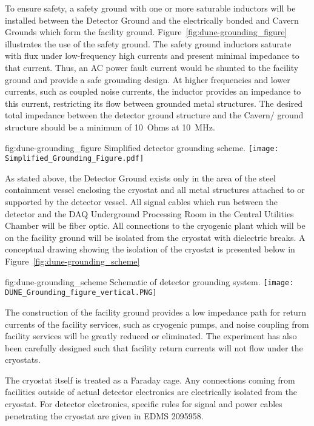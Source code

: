 To ensure safety, a safety ground with one or more saturable inductors
will be installed between the Detector Ground and the electrically
bonded  and Cavern Grounds which form the facility ground.
Figure~\ref{fig:dune-grounding_figure} illustrates the use of the
safety ground. The safety ground inductors saturate with flux under
low-frequency high currents and present minimal impedance to that
current.  Thus, an AC power fault current would be shunted to the
facility ground and provide a safe grounding design. At higher
frequencies and lower currents, such as coupled noise currents, the
inductor provides an impedance to this current, restricting its flow
between grounded metal structures. The desired total impedance between
the detector ground structure and the Cavern/ ground
structure should be a minimum of \SI{10}{Ohms} at \SI{10}{MHz}.

\begin{dunefigure}{fig:dune-grounding_figure}
  {Simplified detector grounding scheme.}
  \texttt{[image: Simplified\_Grounding\_Figure.pdf]}
\end{dunefigure}

As stated above, the Detector Ground exists only in the area of the
steel containment vessel enclosing the cryostat and all metal
structures attached to or supported by the detector vessel.  All
signal cables which run between the detector and the DAQ Underground
Processing Room in the Central Utilities Chamber will be fiber optic.
All connections to the cryogenic plant which will be on the facility
ground will be isolated from the cryostat with dielectric breaks.  A
conceptual drawing showing the isolation of the cryostat is presented
below in Figure~\ref{fig:dune-grounding_scheme}

\begin{dunefigure}{fig:dune-grounding_scheme}
  {Schematic of detector grounding system.}
  \texttt{[image: DUNE\_Grounding\_figure\_vertical.PNG]}
\end{dunefigure}

The construction of the facility ground provides a low impedance path
for return currents of the facility services, such as cryogenic pumps,
and noise coupling from facility services will be greatly reduced or
eliminated.  The experiment has also been carefully designed such that
facility return currents will not flow under the cryostats.

The cryostat itself is treated as a Faraday cage.  Any connections
coming from facilities outside of actual detector electronics are
electrically isolated from the cryostat.  For detector electronics,
specific rules for signal and power cables penetrating the cryostat
are given in EDMS 2095958.





